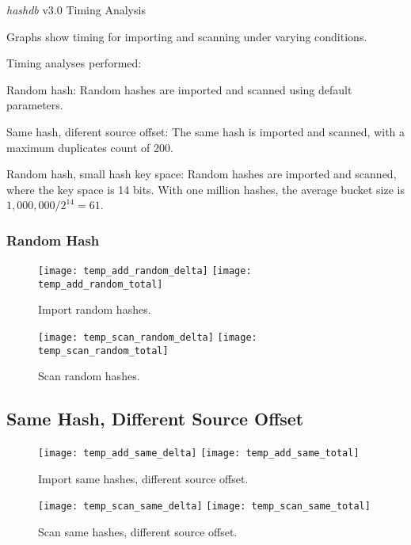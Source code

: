 \documentclass[12pt,twoside]{article}
\newcommand{\hdb}{\emph{hashdb}\xspace}
\begin{document}
\begin{center}
\Large \hdb v3.0 Timing Analysis
\end{center}

Graphs show timing for importing and scanning under varying conditions.

Timing analyses performed:
\begin{compactitem}
\item Random hash: Random hashes are imported and scanned using default parameters.
\item Same hash, diferent source offset: The same hash is imported and scanned, with a maximum duplicates count of 200.
\item Random hash, small hash key space: Random hashes are imported and scanned, where the key space is 14 bits.  With one million hashes, the average bucket size is $1,000,000 / 2^{14} = 61$.
\end{compactitem}

\subsubsection* {Random Hash}

\begin{figure}[H]
  \center
  \texttt{[image: temp\_add\_random\_delta]}
  \texttt{[image: temp\_add\_random\_total]}
  \caption*{Import random hashes.}
\end{figure}

\begin{figure}[H]
  \center
  \texttt{[image: temp\_scan\_random\_delta]}
  \texttt{[image: temp\_scan\_random\_total]}
  \caption*{Scan random hashes.}
\end{figure}

\subsection* {Same Hash, Different Source Offset}

\begin{figure}[H]
  \center
  \texttt{[image: temp\_add\_same\_delta]}
  \texttt{[image: temp\_add\_same\_total]}
  \caption*{Import same hashes, different source offset.}
\end{figure}

\begin{figure}[H]
  \center
  \texttt{[image: temp\_scan\_same\_delta]}
  \texttt{[image: temp\_scan\_same\_total]}
  \caption*{Scan same hashes, different source offset.}
\end{figure}
\end{document}
